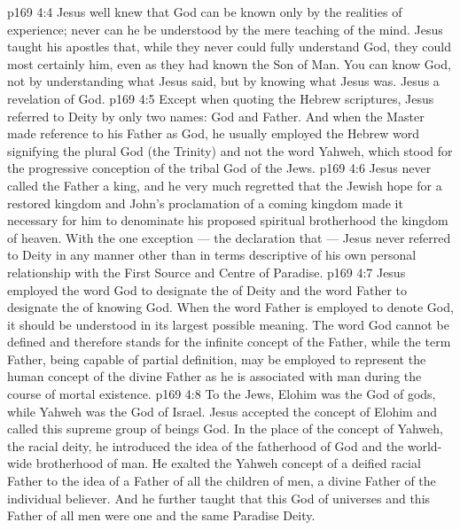 \vs p169 4:4 Jesus well knew that God can be known only by the realities of experience; never can he be understood by the mere teaching of the mind. Jesus taught his apostles that, while they never could fully understand God, they could most certainly  him, even as they had known the Son of Man. You can know God, not by understanding what Jesus said, but by knowing what Jesus was. Jesus  a revelation of God.
\vs p169 4:5 \pc Except when quoting the Hebrew scriptures, Jesus referred to Deity by only two names: God and Father. And when the Master made reference to his Father as God, he usually employed the Hebrew word signifying the plural God (the Trinity) and not the word Yahweh, which stood for the progressive conception of the tribal God of the Jews.
\vs p169 4:6 Jesus never called the Father a king, and he very much regretted that the Jewish hope for a restored kingdom and John’s proclamation of a coming kingdom made it necessary for him to denominate his proposed spiritual brotherhood the kingdom of heaven. With the one exception --- the declaration that  --- Jesus never referred to Deity in any manner other than in terms descriptive of his own personal relationship with the First Source and Centre of Paradise.
\vs p169 4:7 Jesus employed the word God to designate the  of Deity and the word Father to designate the  of knowing God. When the word Father is employed to denote God, it should be understood in its largest possible meaning. The word God cannot be defined and therefore stands for the infinite concept of the Father, while the term Father, being capable of partial definition, may be employed to represent the human concept of the divine Father as he is associated with man during the course of mortal existence.
\vs p169 4:8 To the Jews, Elohim was the God of gods, while Yahweh was the God of Israel. Jesus accepted the concept of Elohim and called this supreme group of beings God. In the place of the concept of Yahweh, the racial deity, he introduced the idea of the fatherhood of God and the world\hyp{}wide brotherhood of man. He exalted the Yahweh concept of a deified racial Father to the idea of a Father of all the children of men, a divine Father of the individual believer. And he further taught that this God of universes and this Father of all men were one and the same Paradise Deity.

